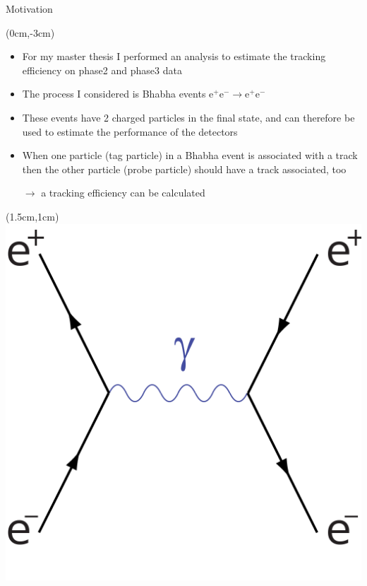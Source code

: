 \documentclass[8pt]{beamer}
\begin{document}
\begin{frame}{Motivation}
	\begin{textblock*}{11cm}(0cm,-3cm)
		
	\begin{itemize}
		\item For my master thesis I performed an analysis to estimate the tracking efficiency on phase2 and phase3 data
		\item The process I considered is Bhabha events $\textrm{e}^+\textrm{e}^- \rightarrow \textrm{e}^+\textrm{e}^-$
		\item These events have 2 charged particles in the final state, and can therefore be used to estimate the performance of the detectors
		\item When one particle (tag particle) in a Bhabha event is associated with a track then the other particle (probe particle)  should have a track associated, too 
		
		$\rightarrow$ a tracking efficiency can be calculated
	\end{itemize}
\end{textblock*}




\begin{textblock*}{3cm}(1.5cm,1cm)
	\includegraphics[width=\textwidth]{VBilder/bhabhaS}
\end{textblock*}


\end{frame}
\end{document}
